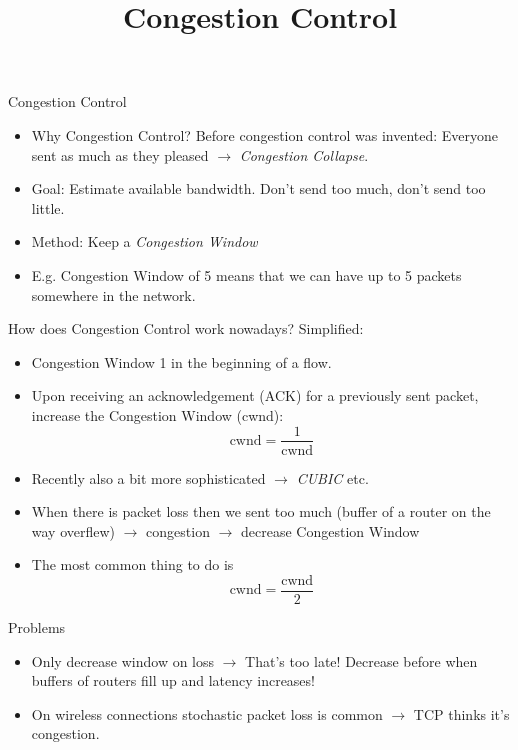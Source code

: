 \documentclass[11pt]{beamer}
\title{Congestion Control}
\begin{document}
\begin{frame}
\titlepage
\end{frame}


\begin{frame}{Congestion Control}
\begin{itemize}
\item Why Congestion Control? Before congestion control was invented: Everyone sent as much as they pleased $\rightarrow$ \textit{Congestion Collapse}.
\item Goal: Estimate available bandwidth. Don't send too much, don't send too little.
\item Method: Keep a \textit{Congestion Window}
\item E.g. Congestion Window of 5 means that we can have up to 5 packets somewhere in the network.
\end{itemize}
\end{frame}

\begin{frame}{How does Congestion Control work nowadays?}
Simplified:
\begin{itemize}
\item Congestion Window 1 in the beginning of a flow.
\item Upon receiving an acknowledgement (ACK) for a previously sent packet, increase the Congestion Window (cwnd): $$\text{cwnd} = \frac{1}{\text{cwnd}}$$
\item Recently also a bit more sophisticated $\rightarrow$ \textit{CUBIC} etc. 
\item When there is packet loss then we sent too much (buffer of a router on the way overflew) $\rightarrow$ congestion $\rightarrow$ decrease Congestion Window
\item The most common thing to do is $$\text{cwnd} = \frac{\text{cwnd}}{2}$$
\end{itemize}
\end{frame}

\begin{frame}{Problems}
\begin{itemize}
\item Only decrease window on loss $\rightarrow$ That's too late! Decrease before when buffers of routers fill up and latency increases!
\item On wireless connections stochastic packet loss is common $\rightarrow$ TCP thinks it's congestion.
\end{itemize}
\end{frame}
\end{document}
